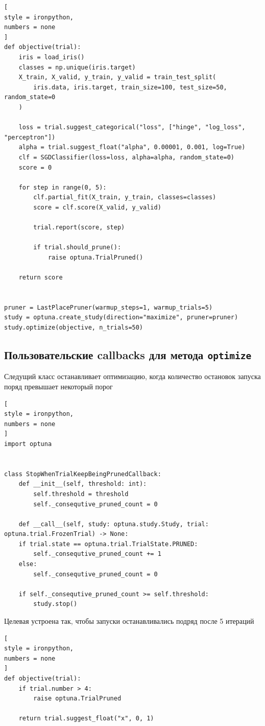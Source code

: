 \documentclass[%
	11pt,
	a4paper,
	utf8,
		]{article}
\begin{document}
\begin{lstlisting}[
style = ironpython,
numbers = none
]
def objective(trial):
	iris = load_iris()
	classes = np.unique(iris.target)
	X_train, X_valid, y_train, y_valid = train_test_split(
		iris.data, iris.target, train_size=100, test_size=50, random_state=0
	)

	loss = trial.suggest_categorical("loss", ["hinge", "log_loss", "perceptron"])
	alpha = trial.suggest_float("alpha", 0.00001, 0.001, log=True)
	clf = SGDClassifier(loss=loss, alpha=alpha, random_state=0)
	score = 0

	for step in range(0, 5):
		clf.partial_fit(X_train, y_train, classes=classes)
		score = clf.score(X_valid, y_valid)
		
		trial.report(score, step)
		
		if trial.should_prune():
			raise optuna.TrialPruned()

	return score


pruner = LastPlacePruner(warmup_steps=1, warmup_trials=5)
study = optuna.create_study(direction="maximize", pruner=pruner)
study.optimize(objective, n_trials=50)
\end{lstlisting}

\subsection{Пользовательские callbacks для метода \texttt{optimize}}

Следущий класс останавливает оптимизацию, когда количество остановок запуска поряд превышает некоторый порог
\begin{lstlisting}[
style = ironpython,
numbers = none
]
import optuna


class StopWhenTrialKeepBeingPrunedCallback:
	def __init__(self, threshold: int):
		self.threshold = threshold
		self._consequtive_pruned_count = 0

	def __call__(self, study: optuna.study.Study, trial: optuna.trial.FrozenTrial) -> None:
	if trial.state == optuna.trial.TrialState.PRUNED:
		self._consequtive_pruned_count += 1
	else:
		self._consequtive_pruned_count = 0

	if self._consequtive_pruned_count >= self.threshold:
		study.stop()
\end{lstlisting}

Целевая устроена так, чтобы запуски останавливались подряд после 5 итераций
\begin{lstlisting}[
style = ironpython,
numbers = none
]
def objective(trial):
	if trial.number > 4:
		raise optuna.TrialPruned

	return trial.suggest_float("x", 0, 1)
\end{lstlisting}
\end{document}
